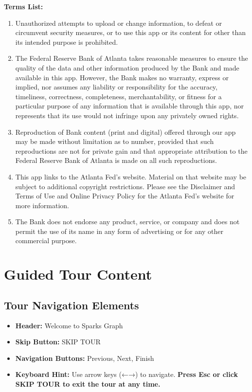 \documentclass[11pt]{article}
\begin{document}
\textbf{Terms List:}
\begin{enumerate}
    \item Unauthorized attempts to upload or change information, to defeat or circumvent security measures, or to use this app or its content for other than its intended purpose is prohibited.
    
    \item The Federal Reserve Bank of Atlanta takes reasonable measures to ensure the quality of the data and other information produced by the Bank and made available in this app. However, the Bank makes no warranty, express or implied, nor assumes any liability or responsibility for the accuracy, timeliness, correctness, completeness, merchantability, or fitness for a particular purpose of any information that is available through this app, nor represents that its use would not infringe upon any privately owned rights.
    
    \item Reproduction of Bank content (print and digital) offered through our app may be made without limitation as to number, provided that such reproductions are not for private gain and that appropriate attribution to the Federal Reserve Bank of Atlanta is made on all such reproductions.
    
    \item This app links to the Atlanta Fed's website. Material on that website may be subject to additional copyright restrictions. Please see the Disclaimer and Terms of Use and Online Privacy Policy for the Atlanta Fed's website for more information.
    
    \item The Bank does not endorse any product, service, or company and does not permit the use of its name in any form of advertising or for any other commercial purpose.
\end{enumerate}

\section{Guided Tour Content}

\subsection{Tour Navigation Elements}
\begin{itemize}
    \item \textbf{Header:} Welcome to Sparks Graph
    \item \textbf{Skip Button:} SKIP TOUR
    \item \textbf{Navigation Buttons:} Previous, Next, Finish
    \item \textbf{Keyboard Hint:} Use arrow keys (←→) to navigate. \textbf{Press Esc or click SKIP TOUR to exit the tour at any time.}
\end{itemize}
\end{document}
